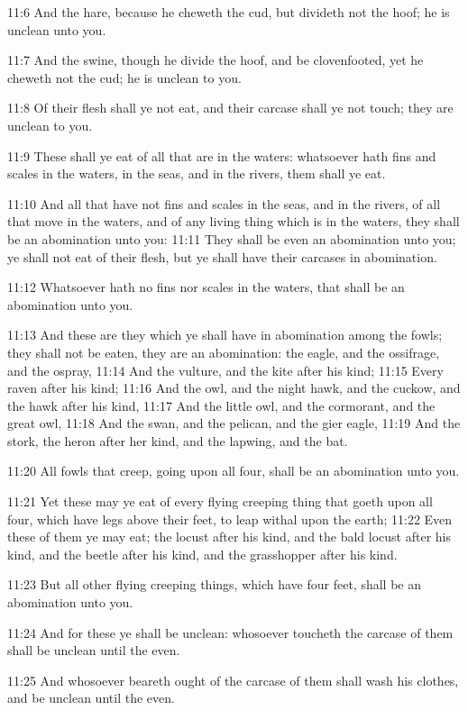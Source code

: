 11:6 And the hare, because he cheweth the cud, but divideth not the
hoof; he is unclean unto you.

11:7 And the swine, though he divide the hoof, and be clovenfooted,
yet he cheweth not the cud; he is unclean to you.

11:8 Of their flesh shall ye not eat, and their carcase shall ye not
touch; they are unclean to you.

11:9 These shall ye eat of all that are in the waters: whatsoever hath
fins and scales in the waters, in the seas, and in the rivers, them
shall ye eat.

11:10 And all that have not fins and scales in the seas, and in the
rivers, of all that move in the waters, and of any living thing which
is in the waters, they shall be an abomination unto you: 11:11 They
shall be even an abomination unto you; ye shall not eat of their
flesh, but ye shall have their carcases in abomination.

11:12 Whatsoever hath no fins nor scales in the waters, that shall be
an abomination unto you.

11:13 And these are they which ye shall have in abomination among the
fowls; they shall not be eaten, they are an abomination: the eagle,
and the ossifrage, and the ospray, 11:14 And the vulture, and the kite
after his kind; 11:15 Every raven after his kind; 11:16 And the owl,
and the night hawk, and the cuckow, and the hawk after his kind, 11:17
And the little owl, and the cormorant, and the great owl, 11:18 And
the swan, and the pelican, and the gier eagle, 11:19 And the stork,
the heron after her kind, and the lapwing, and the bat.

11:20 All fowls that creep, going upon all four, shall be an
abomination unto you.

11:21 Yet these may ye eat of every flying creeping thing that goeth
upon all four, which have legs above their feet, to leap withal upon
the earth; 11:22 Even these of them ye may eat; the locust after his
kind, and the bald locust after his kind, and the beetle after his
kind, and the grasshopper after his kind.

11:23 But all other flying creeping things, which have four feet,
shall be an abomination unto you.

11:24 And for these ye shall be unclean: whosoever toucheth the
carcase of them shall be unclean until the even.

11:25 And whosoever beareth ought of the carcase of them shall wash
his clothes, and be unclean until the even.

